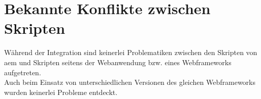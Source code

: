 \section{Bekannte Konflikte zwischen Skripten}
\label{sec:konflikte}
Während der Integration sind keinerlei Problematiken zwischen den Skripten von \ac{aem} und Skripten seitens der Webanwendung bzw. eines Webframeworks aufgetreten. \\
Auch beim Einsatz von unterschiedlichen Versionen des gleichen Webframeworks wurden keinerlei Probleme entdeckt.